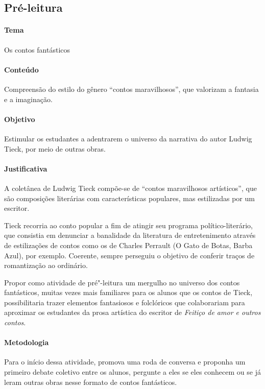 \documentclass[12pt]{extarticle}
\begin{document}
\subsection{Pré-leitura}

\paragraph{Tema} Os contos fantásticos

\paragraph{Conteúdo} Compreensão do estilo do gênero ``contos maravilhosos'', 
que valorizam a fantasia e a imaginação. 

\paragraph{Objetivo} Estimular os estudantes a adentrarem o universo da narrativa 
do autor Ludwig Tieck, por meio de outras obras.

\paragraph{Justificativa} A coletânea de Ludwig Tieck compõe-se de ``contos
maravilhosos artísticos'', que são composições literárias com
características populares, mas estilizadas por um escritor.

Tieck recorria ao conto popular
a fim de atingir seu programa político-literário, que consistia
em denunciar a banalidade da literatura de entretenimento
através de estilizações de contos como os de Charles Perrault
(O Gato de Botas, Barba Azul), por exemplo. Coerente, sempre perseguiu
o objetivo de conferir traços de romantização ao ordinário.

Propor como atividade de pré"-leitura um mergulho no universo dos contos 
fantásticos, muitas vezes mais familiares para os alunos que os contos de Tieck, 
possibilitaria trazer elementos fantasiosos e folclóricos que colaborariam para
aproximar os estudantes da prosa artística do escritor de \textit{Feitiço de amor e outros contos}.

\paragraph{Metodologia}
Para o início dessa atividade, promova uma roda de conversa e proponha um primeiro debate
coletivo entre os alunos, pergunte a eles se eles conhecem ou se já leram outras obras 
nesse formato de contos fantásticos.
\end{document}
